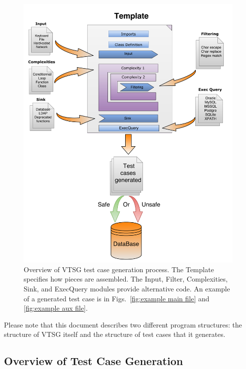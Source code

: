 \documentclass[12pt]{article}
\begin{document}
\begin{figure}[htbp]
  \includegraphics[width=1\linewidth]{fig_VTSG_overview.png}
  \caption{Overview of VTSG test case generation process. The Template
  specifies how pieces are assembled. The Input, Filter, Complexities,
  Sink, and ExecQuery modules provide alternative code.  
  An example of
  a generated test case is in 
  Figs.~\ref{fig:example main file} and 
  \ref{fig:example aux file}.}
  \label{fig:VTS operation overview}
\end{figure}

Please note that this document describes two different program structures: the
structure of VTSG itself and the structure of test cases that it generates.

\subsection{Overview of Test Case Generation}
\end{document}
